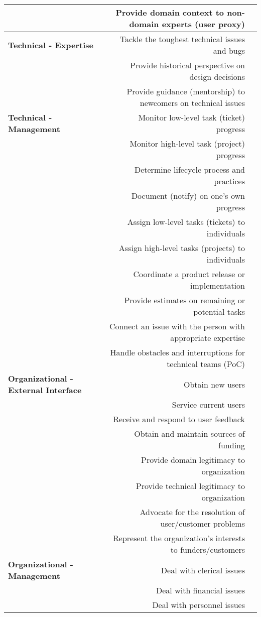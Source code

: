 \begin{table*}[tb]
\begin{tabular}{l@{\hspace{-3cm}}r@{\hspace{2pt}}c}
& Provide domain context to non-domain experts (user proxy)&\\
%
%
\midrule
\textbf{Technical - Expertise}
& Tackle the toughest technical issues and bugs&\\
& Provide historical perspective on design decisions&\\
& Provide guidance (mentorship) to newcomers on technical issues&\\
%
%
\midrule
\textbf{Technical - Management}
& Monitor low-level task (ticket) progress&\\
& Monitor high-level task (project) progress&\\
& Determine lifecycle process and practices&\\
& Document (notify) on one's own progress&\\
& Assign low-level tasks (tickets) to individuals&\\
& Assign high-level tasks (projects) to individuals&\\
& Coordinate a product release or implementation&\\
& Provide estimates on remaining or potential tasks&\\
& Connect an issue with the person with appropriate expertise&\\
& Handle obstacles and interruptions for technical teams (PoC)&\\
%
%
\midrule
\textbf{Organizational - External Interface}
& Obtain new users&\\
& Service current users&\\
& Receive and respond to user feedback&\\
& Obtain and maintain sources of funding&\\
& Provide domain legitimacy to organization&\\
& Provide technical legitimacy to organization&\\
& Advocate for the resolution of user/customer problems&\\
& Represent the organization's interests to funders/customers&\\
%
%
\midrule
\textbf{Organizational - Management}
& Deal with clerical issues&\\
& Deal with financial issues&\\
& Deal with personnel issues&\\

\end{tabular}
\end{table*}
